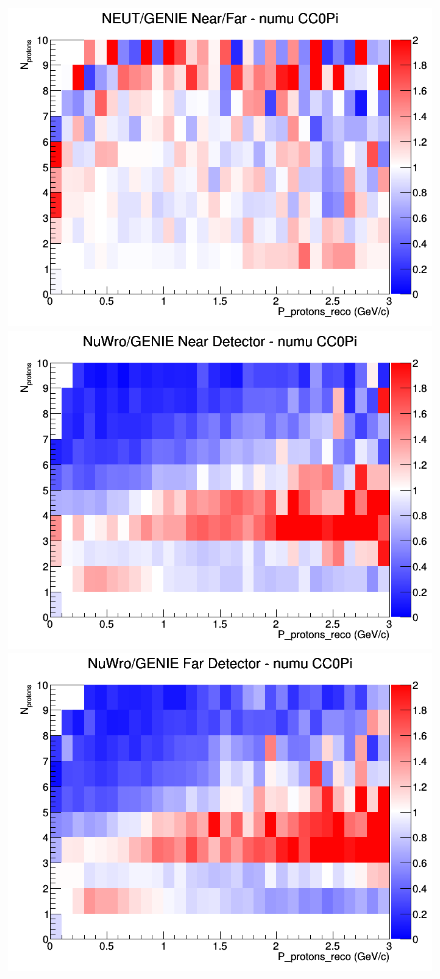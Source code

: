 \begin{figure}[h]
\endminipage
{}
\includegraphics[width=\linewidth]{eff_N_P/LAr/protons/ratios/CC0Pi_NEUT_GENIE_numu_NF_N_P.png}
\endminipage
\newline
{}
\includegraphics[width=\linewidth]{eff_N_P/LAr/protons/ratios/CC0Pi_NuWro_GENIE_numu_near_N_P.png}
\endminipage
{}
\includegraphics[width=\linewidth]{eff_N_P/LAr/protons/ratios/CC0Pi_NuWro_GENIE_numu_far_N_P.png}

\end{figure}
